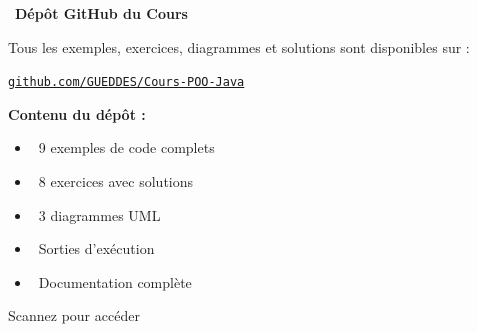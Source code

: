 






\maketitle
\thispagestyle{empty}


\vspace{1cm}

\begin{tcolorbox}[colback=githubblue!5!white, colframe=githubblue, boxrule=1.5pt, arc=5mm]
    \centering
    \Large \faGithub\ \textbf{Dépôt GitHub du Cours}
    
    \vspace{8pt}
    
    \large Tous les exemples, exercices, diagrammes et solutions sont disponibles sur :
    
    \vspace{5pt}
    
    {\LARGE \href{\repourl}{\texttt{github.com/GUEDDES/Cours-POO-Java}}}
    
    \vspace{8pt}
    
    \begin{minipage}{0.6\textwidth}
        \textbf{Contenu du dépôt :}
        \begin{itemize}
            \item \faCode\ 9 exemples de code complets
            \item \faPencilAlt\ 8 exercices avec solutions
            \item \faProjectDiagram\ 3 diagrammes UML
            \item \faTerminal\ Sorties d'exécution
            \item \faBook\ Documentation complète
        \end{itemize}
    \end{minipage}
    \hfill
    \begin{minipage}{0.35\textwidth}
        \centering
        \qrcode[height=4cm]{\repourl}
        
        \small Scannez pour accéder
    \end{minipage}
\end{tcolorbox}

